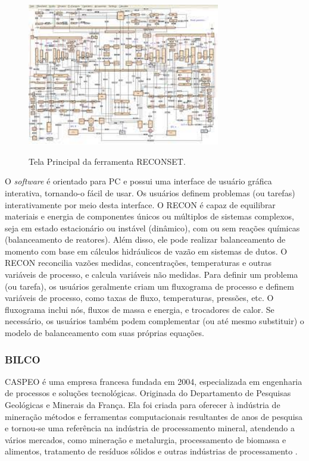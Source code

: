 \begin{figure}[htbp!] 
    \begin{center}
        \includegraphics[width=0.75\textwidth]{figuras/RECONSET.jpg}
        \caption{Tela Principal da ferramenta RECONSET.}
        \vspace{6mm}
        \label{fig:RECONSET}
    \end{center} 
\end{figure}

O \textit{software} é orientado para PC e possui uma interface de usuário gráfica interativa, tornando-o fácil de usar. Os usuários definem problemas (ou tarefas) interativamente por meio desta interface. O RECON é capaz de equilibrar materiais e energia de componentes únicos ou múltiplos de sistemas complexos, seja em estado estacionário ou instável (dinâmico), com ou sem reações químicas (balanceamento de reatores). Além disso, ele pode realizar balanceamento de momento com base em cálculos hidráulicos de vazão em sistemas de dutos. O RECON reconcilia vazões medidas, concentrações, temperaturas e outras variáveis de processo, e calcula variáveis não medidas. Para definir um problema (ou tarefa), os usuários geralmente criam um fluxograma de processo e definem variáveis de processo, como taxas de fluxo, temperaturas, pressões, etc. O fluxograma inclui nós, fluxos de massa e energia, e trocadores de calor. Se necessário, os usuários também podem complementar (ou até mesmo substituir) o modelo de balanceamento com suas próprias equações.

\subsubsection{BILCO}

CASPEO é uma empresa francesa fundada em 2004, especializada em engenharia de processos e soluções tecnológicas. Originada do 
Departamento de Pesquisas Geológicas e Minerais da França. Ela foi criada para oferecer à indústria de mineração métodos e ferramentas computacionais resultantes de anos de pesquisa e tornou-se uma referência na indústria de processamento mineral, atendendo a vários mercados, como mineração e metalurgia, processamento de biomassa e alimentos, tratamento de resíduos sólidos e outras indústrias de processamento \cite{bilco}.

